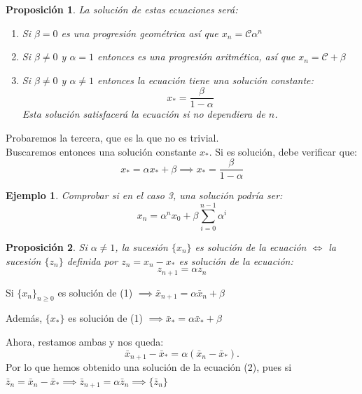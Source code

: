 \documentclass[11pt, a4paper, titlepage]{article}
\makeatletter
\renewenvironment{proof}[1][\proofname] {\vspace{-15pt}\par\pushQED{\qed}\normalfont\topsep6\p@\@plus6\p@\relax\trivlist\item[\hskip\labelsep\it#1\@addpunct{.}]\ignorespaces}{\popQED\endtrivlist\@endpefalse}
\theoremstyle{theorem-style}
\newtheorem*{nprop}{Proposición}
\theoremstyle{definition-style}
\theoremstyle{remark-style}
\theoremstyle{example-style}
\newtheorem*{ejemplo}{Ejemplo}
\newenvironment{nlist}
{\begin{enumerate}
\renewcommand\labelenumi{(\emph{\roman{enumi})}}}
{\end{enumerate}}
\makeatother
\begin{document}
\begin{nprop}
	La solución de estas ecuaciones será:
	\begin{nlist}
	\item Si $\beta = 0$ es una progresión geométrica así que $x_n =  \mathcal{C} \alpha^n$
	\item Si $\beta \ne 0$ y $\alpha  = 1$ entonces es una progresión aritmética, así que $x_n = \mathcal{C} + \beta$
	\item Si $\beta \ne 0 $ y $\alpha \ne 1 $ entonces la ecuación tiene una solución constante:
	\[
	x_* = \frac{\beta}{1-\alpha}
	\]
	Esta solución satisfacerá la ecuación si no dependiera de $n$.
\end{nlist}
\end{nprop}
\begin{proof}
	Probaremos la tercera, que es la que no es trivial.\\
	Buscaremos entonces una solución constante $x_*$. Si es solución, debe verificar que:
$$x_* =  \alpha x_* + \beta \implies  x_* = \dfrac{\beta}{1 - \alpha}$$
\end{proof}

\begin{ejemplo}
	Comprobar si en el caso 3, una solución podría ser: \[x_n = \alpha^n x_0 + \beta \sum_{i=0}^{n-1}\alpha^i\]
\end{ejemplo}

\begin{nprop}
	Si $\alpha \ne 1$, la sucesión $\{x_n\}$ es solución de la ecuación $\iff$ la sucesión $\{z_n\}$ definida por $z_n = x_n - x_*$ es solución de la ecuación:
	\[
	z_{n+1} =  \alpha z_n
	\]
\end{nprop}
\begin{proof}
	Si $\{x_n\}_{n\geq 0}$ es solución de (1) $\implies \bar{x}_{n+1}= \alpha\bar{x}_n+\beta$
	
	
	Además, $\{x_*\}$ es solución de (1) $\implies \bar{x}_{*}= \alpha\bar{x}_*+\beta$
	
	Ahora, restamos ambas y nos queda:
	\[
	\bar{x}_{n+1} - \bar{x}_*= \alpha (\bar{x}_n - \bar{x}_*).
	\]
	Por lo que hemos obtenido una solución de la ecuación (2), pues si $\bar{z}_n= \bar{x}_n - \bar{x}_*\implies \bar{z}_{n+1}= \alpha \bar{z}_n \implies \{\bar{z}_n\}_{}$
	
\end{proof}
\end{document}
